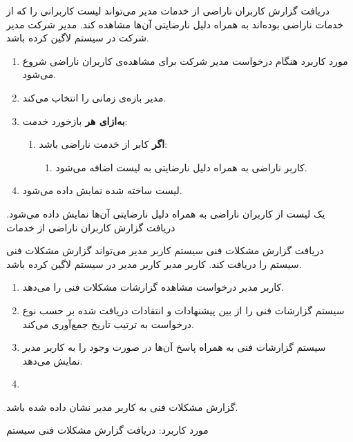 {
\usecase
{دریافت گزارش کاربران ناراضی از خدمات}
{}
{مدیر می‌تواند لیست کاربرانی را که از خدمات ناراضی بوده‌اند به همراه دلیل نارضایتی آن‌ها مشاهده کند.}
{مدیر شرکت}
{}
{مدیر شرکت در سیستم لاگین کرده باشد.}
{
	\vspace*{-0.6cm}
	\begin{enumerate}
		\item 
		مورد کاربرد هنگام درخواست مدیر شرکت برای مشاهده‌ی کاربران ناراضی شروع می‌شود.
		\item
		مدیر بازه‌ی زمانی را انتخاب می‌کند.
		\item
		\textbf{به‌ازای هر} بازخورد خدمت:
		\begin{enumerate}[label=\theenumi.\arabic*.]
			\item 
			\textbf{اگر} کابر از خدمت ناراضی باشد:
			\begin{enumerate}
				\item 
				کاربر ناراضی به همراه دلیل نارضایتی به لیست اضافه می‌شود.
			\end{enumerate}
		\end{enumerate}
		\item
		لیست ساخته شده نمایش داده می‌شود.
	\end{enumerate}
}
{یک لیست از کاربران ناراضی به همراه دلیل نارضایتی آن‌ها نمایش داده می‌شود.}
{
}
{
	دریافت گزارش کاربران ناراضی از خدمات
}
}

{
	\usecase
	{دریافت گزارش مشکلات فنی سیستم}
	{}
	{کاربر مدیر می‌تواند گزارش مشکلات فنی سیستم را دریافت کند.}
	{کاربر مدیر}
	{}
	{کاربر مدیر در سیستم لاگین کرده باشد.}
	{
		\vspace*{-0.6cm}
		\begin{enumerate}
			\item 
کاربر مدیر درخواست مشاهده گزارشات مشکلات فنی را می‌دهد.
			\item
سیستم گزارشات فنی را از بین پیشنهادات و انتقادات دریافت شده بر حسب نوع درخواست به ترتیب تاریخ جمع‌آوری می‌کند.
			\item
سیستم گزارشات فنی به همراه پاسخ‌ آن‌ها در صورت وجود را به کاربر مدیر نمایش می‌دهد.
			\item
		\end{enumerate}
	}
	{
گزارش مشکلات فنی به کاربر مدیر نشان داده شده باشد.	
}
	{

	}
	{
	مورد کاربرد:	دریافت گزارش مشکلات فنی سیستم
	}

}


